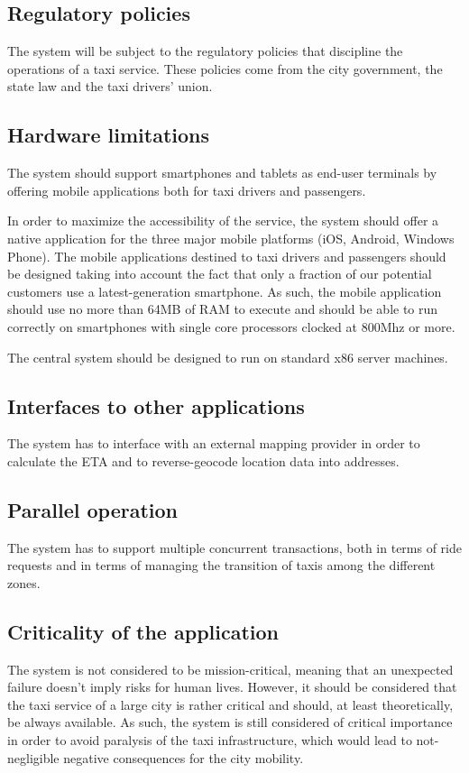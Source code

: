 \subsection{Regulatory policies}
The system will be subject to the regulatory policies that discipline the operations of a taxi service. These policies come from the city government, the state law and the taxi drivers' union.


\subsection{Hardware limitations}
The system should support smartphones and tablets as end-user terminals by offering mobile applications both for taxi drivers and passengers. 

In order to maximize the accessibility of the service, the system should offer a native application for the three major mobile platforms (iOS, Android, Windows Phone).
The mobile applications destined to taxi drivers and passengers should be designed taking into account the fact that only a fraction of our potential customers use a latest-generation smartphone. As such, the mobile application should use no more than 64MB of RAM to execute and should be able to run correctly on smartphones with single core processors clocked at 800Mhz or more.

The central system should be designed to run on standard x86 server machines.


\subsection{Interfaces to other applications}
The system has to interface with an external mapping provider in order to calculate the ETA and to reverse-geocode location data into addresses.


\subsection{Parallel operation}
The system has to support multiple concurrent transactions, both in terms of ride requests and in terms of managing the transition of taxis among the different zones. 


\subsection{Criticality of the application}
The system is not considered to be mission-critical, meaning that an unexpected failure doesn't imply risks for human lives. 
However, it should be considered that the taxi service of a large city is rather critical and should, at least theoretically, be always available. As such, the system is still considered of critical importance in order to avoid paralysis of the taxi infrastructure, which would lead to not-negligible negative consequences for the city mobility.


